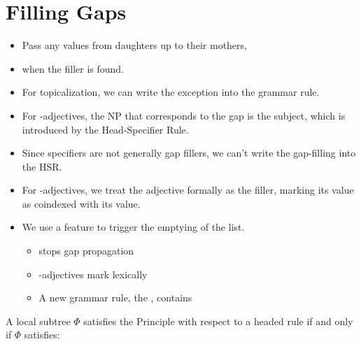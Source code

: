 \documentclass[a4paper,landscape,headrule,footrule]{foils}
\begin{document}
\section[Filling gaps: \ft{stop-gap}, the Head-Filler Rule and \lex{easy}-adjectives]{Filling Gaps}

\MyLogo{}
\begin{itemize}
\item Pass any  values from daughters up to their
mothers,
\item[\ldots]  when the filler is found.
\item For topicalization, we can write the exception into
the grammar rule.
\item For -adjectives, the NP that corresponds to the
gap is the subject, which is introduced by the
Head-Specifier Rule.
\item Since specifiers are not generally gap fillers, we
can't write the gap-filling into the HSR.
\end{itemize}

\begin{itemize}
\item For -adjectives, we treat the adjective formally
as the filler, marking its  value as coindexed
with its  value.
\item We use a feature  to trigger the
  emptying of the  list.
  \begin{itemize}
  \item {} stops gap propagation
  \item {}-adjectives mark  lexically
  \item A new grammar rule, the ,
    contains 
  \end{itemize}
\end{itemize}

A local subtree $\Phi$ satisfies the  Principle with respect to a
headed rule  if and only if $\Phi$ satisfies:


\end{document}
